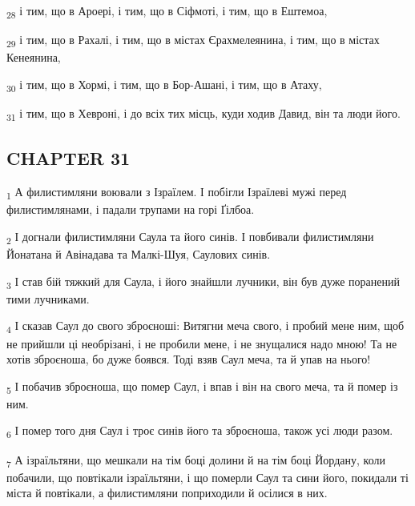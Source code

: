 \begin{tcolorbox}
\textsubscript{28} і тим, що в Ароері, і тим, що в Сіфмоті, і тим, що в Ештемоа,
\end{tcolorbox}
\begin{tcolorbox}
\textsubscript{29} і тим, що в Рахалі, і тим, що в містах Єрахмелеянина, і тим, що в містах Кенеянина,
\end{tcolorbox}
\begin{tcolorbox}
\textsubscript{30} і тим, що в Хормі, і тим, що в Бор-Ашані, і тим, що в Атаху,
\end{tcolorbox}
\begin{tcolorbox}
\textsubscript{31} і тим, що в Хевроні, і до всіх тих місць, куди ходив Давид, він та люди його.
\end{tcolorbox}
\subsection{CHAPTER 31}
\begin{tcolorbox}
\textsubscript{1} А филистимляни воювали з Ізраїлем. І побігли Ізраїлеві мужі перед филистимлянами, і падали трупами на горі Ґілбоа.
\end{tcolorbox}
\begin{tcolorbox}
\textsubscript{2} І догнали филистимляни Саула та його синів. І повбивали филистимляни Йонатана й Авінадава та Малкі-Шуя, Саулових синів.
\end{tcolorbox}
\begin{tcolorbox}
\textsubscript{3} І став бій тяжкий для Саула, і його знайшли лучники, він був дуже поранений тими лучниками.
\end{tcolorbox}
\begin{tcolorbox}
\textsubscript{4} І сказав Саул до свого зброєноші: Витягни меча свого, і пробий мене ним, щоб не прийшли ці необрізані, і не пробили мене, і не знущалися надо мною! Та не хотів зброєноша, бо дуже боявся. Тоді взяв Саул меча, та й упав на нього!
\end{tcolorbox}
\begin{tcolorbox}
\textsubscript{5} І побачив зброєноша, що помер Саул, і впав і він на свого меча, та й помер із ним.
\end{tcolorbox}
\begin{tcolorbox}
\textsubscript{6} І помер того дня Саул і троє синів його та зброєноша, також усі люди разом.
\end{tcolorbox}
\begin{tcolorbox}
\textsubscript{7} А ізраїльтяни, що мешкали на тім боці долини й на тім боці Йордану, коли побачили, що повтікали ізраїльтяни, і що померли Саул та сини його, покидали ті міста й повтікали, а филистимляни поприходили й осілися в них.
\end{tcolorbox}
